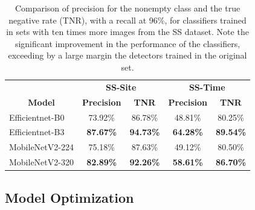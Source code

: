 \begin{table}[htb]
\caption[Comparison of precision for the nonempty class and the true negative
rate (TNR)]{Comparison of precision for the nonempty class and the true negative
rate (TNR), with a recall at 96\%, for classifiers trained in sets with ten
times more images from the SS dataset. Note the significant improvement in the
performance of the classifiers, exceeding by a large margin the detectors
trained in the original set.}
\begin{center}
\setlength{\tabcolsep}{3pt}
\begin{tabular}{l|cc|cc}
 \hline
\textbf{}                            & \multicolumn{2}{c|}{\textbf{SS-Site}}

                                & \multicolumn{2}{c}{\textbf{SS-Time}}
                          \\
\multicolumn{1}{c|}{\textbf{Model}} & \multicolumn{1}{c}{\textbf{Precision}} &
\multicolumn{1}{c|}{\textbf{TNR}} & \multicolumn{1}{c}{\textbf{Precision}} &
\multicolumn{1}{c}{\textbf{TNR}} \\ \hline \hline
Efficientnet-B0                      & 73.92\%                               &
86.78\%                           & 48.81\%                               &
80.25\%                          \\
Efficientnet-B3                      & \textbf{87.67\%}                      &
\textbf{94.73\%}                  & \textbf{64.28\%}                      &
\textbf{89.54\%}                 \\
MobileNetV2-224                      & 75.18\%                               &
87.63\%                           & 49.12\%                               &
80.50\%                          \\
MobileNetV2-320                      & \textbf{82.89\%}                      &
\textbf{92.26\%}                  & \textbf{58.61\%}                      &
\textbf{86.70\%}                 \\ \hline
\end{tabular}
\end{center}
\label{table:more_images}
\end{table}

\subsection{Model Optimization}

